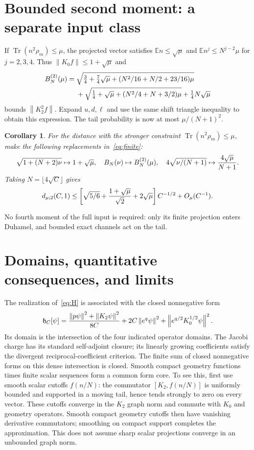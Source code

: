 \documentclass[11pt]{article}
\newtheorem{corollary}{Corollary}
\newcommand{\tr}{\operatorname{Tr}}
\newcommand{\norm}[1]{\left\lVert#1\right\rVert}
\begin{document}
\section{Bounded second moment: a separate input class}
If $\tr(n^2\rho_m)\le\mu$, the projected vector satisfies
$\mathbb E n\le\sqrt\mu$ and $\mathbb E n^j\le N^{j-2}\mu$
for $j=2,3,4$. Thus $\norm{K_0f}\le1+\sqrt\mu$ and
\begin{align}
 B_N^{(2)}(\mu)={}&\sqrt{\tfrac34+\tfrac74\sqrt\mu+
                    (N^2/16+N/2+23/16)\mu}\notag\\
 &+\sqrt{\tfrac14+\sqrt\mu+(N^2/4+N+3/2)\mu}
                    +\tfrac14N\sqrt\mu\label{eq:B2}
\end{align}
bounds $\norm{K_2^2f}$. Expand $u,d,\ell$ and use the same shift
triangle inequality to obtain this expression. The tail probability
is now at most $\mu/(N+1)^2$.

\begin{corollary}
For the distance with the stronger constraint $\tr(n^2\rho_m)\le\mu$,
make the following replacements in~\eqref{eq:finite}:
\[
 \sqrt{1+(N+2)\nu}\mapsto1+\sqrt\mu,\quad
 B_N(\nu)\mapsto B_N^{(2)}(\mu),\quad
 4\sqrt{\nu/(N+1)}\mapsto {4\sqrt\mu\over N+1}.
\]
Taking $N=\lfloor4\sqrt C\rfloor$ gives
\begin{equation}
 d_{\mu;2}(C,1)\le
 \left[\sqrt{5/6}+{1+\sqrt\mu\over\sqrt2}+2\sqrt\mu\right]C^{-1/2}
       +O_\mu(C^{-1}).\label{eq:second}
\end{equation}
\end{corollary}
No fourth moment of the full input is required: only its finite projection
enters Duhamel, and bounded exact channels act on the tail.

\section{Domains, quantitative consequences, and limits}\label{sec:domains}
The realization of~\eqref{eq:H} is associated with the closed nonnegative form
\begin{equation}
 \mathfrak h_C[\psi]={\norm{p\psi}^2+\norm{K_2\psi}^2\over8C}
     +2C\norm{e^q\psi}^2+\norm{e^{q/2}K_0^{1/2}\psi}^2.\label{eq:form}
\end{equation}
Its domain is the intersection of the four indicated operator domains.
The Jacobi charge has its standard self-adjoint closure; its linearly
growing coefficients satisfy the divergent reciprocal-coefficient
criterion. The finite sum of closed nonnegative forms on this dense
intersection is closed. Smooth compact geometry functions times finite
scalar sequences form a common form core. To see this, first use smooth
scalar cutoffs $f(n/N)$: the commutator $[K_2,f(n/N)]$ is uniformly bounded
and supported in a moving tail, hence tends strongly to zero on every
vector. These cutoffs converge in the $K_2$ graph norm and commute with
$K_0$ and geometry operators. Smooth compact geometry cutoffs then have
vanishing derivative commutators; smoothing on compact support completes
the approximation. This does not assume sharp scalar projections converge
in an unbounded graph norm.
\end{document}
